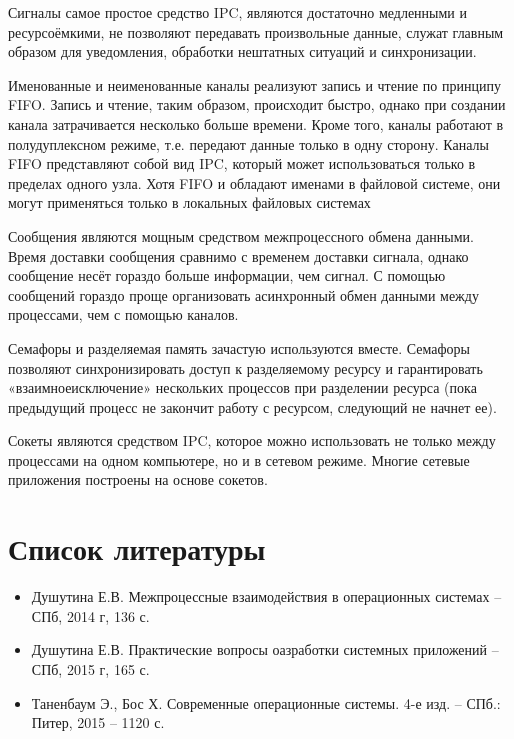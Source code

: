 \documentclass[a4paper]{article}
\begin{document}
	Сигналы самое простое средство IPC, являются достаточно медленными и ресурсоёмкими, не позволяют передавать произвольные данные, служат главным образом для уведомления, обработки нештатных ситуаций и синхронизации.
	
	Именованные и неименованные каналы реализуют запись и чтение по принципу FIFO. Запись и чтение, таким образом, происходит быстро, однако при создании канала затрачивается несколько больше времени. Кроме того, каналы работают в полудуплексном режиме, т.е. передают данные только в одну сторону. Каналы FIFO представляют собой вид IPC, который может использоваться только в пределах одного узла. Хотя FIFO и обладают именами в файловой системе, они могут применяться только в локальных файловых системах

	Сообщения являются мощным средством межпроцессного обмена данными. Время доставки сообщения сравнимо с временем доставки сигнала, однако сообщение несёт гораздо больше информации, чем сигнал. С помощью сообщений гораздо проще организовать асинхронный обмен данными между процессами, чем с помощью каналов.
	
	Семафоры и разделяемая память зачастую используются вместе. Семафоры позволяют синхронизировать доступ к разделяемому ресурсу и гарантировать «взаимноеисключение» нескольких процессов при разделении ресурса (пока предыдущий процесс не закончит работу с ресурсом, следующий не начнет ее).
	
	Сокеты являются средством IPC, которое можно использовать не только между процессами на одном компьютере, но и в сетевом режиме. Многие сетевые приложения построены на основе сокетов.


\section{Список литературы}
\begin{itemize}
\item Душутина Е.В.  Межпроцессные взаимодействия в операционных системах – СПб, 2014 г, 136 с.
\item Душутина Е.В.  Практические вопросы оазработки системных приложений – СПб, 2015 г, 165 с.
\item Таненбаум Э., Бос Х. Современные операционные системы. 4-е изд. – СПб.: Питер, 2015 – 1120 с.
\end{itemize}
\end{document}
